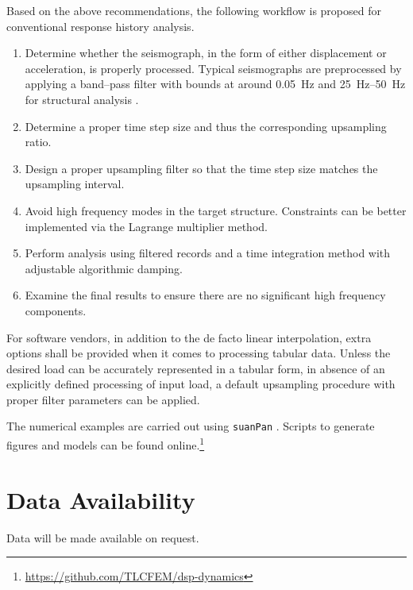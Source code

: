 Based on the above recommendations, the following workflow is proposed for conventional response history analysis.
\begin{enumerate}
\item Determine whether the seismograph, in the form of either displacement or acceleration, is properly processed. Typical seismographs are preprocessed by applying a band--pass filter with bounds at around \SI{0.05}{\hertz} and \SIrange{25}{50}{\hertz} for structural analysis \citep[see, e.g.,][]{Houtte2017}.
\item Determine a proper time step size and thus the corresponding upsampling ratio.
\item Design a proper upsampling filter so that the time step size matches the upsampling interval.
\item Avoid high frequency modes in the target structure. Constraints can be better implemented via the Lagrange multiplier method.
\item Perform analysis using filtered records and a time integration method with adjustable algorithmic damping.
\item Examine the final results to ensure there are no significant high frequency components.
\end{enumerate}

For software vendors, in addition to the de facto linear interpolation, extra options shall be provided when it comes to processing tabular data. Unless the desired load can be accurately represented in a tabular form, in absence of an explicitly defined processing of input load, a default upsampling procedure with proper filter parameters can be applied.

The numerical examples are carried out using \texttt{suanPan} \citep{Chang2022}. Scripts to generate figures and models can be found online.\footnote{\url{https://github.com/TLCFEM/dsp-dynamics}}
\section*{Data Availability}
Data will be made available on request.